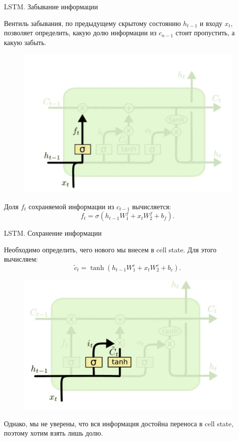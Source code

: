 \documentclass[notheorems, handout, 10pt]{beamer}
\begin{document}
	\begin{frame}{LSTM. Забывание информации}
		
		Вентиль забывания, по предыдущему скрытому состоянию $h_{t-1}$ и входу $x_t$, позволяет определить, какую долю информации из $c_{n-1}$ стоит пропустить, а какую забыть.
		
		\begin{figure}[H]
			\includegraphics[width=0.5\linewidth]{images/7}
		\end{figure}
		
		Доля $f_t$ сохраняемой информации из $c_{t-1}$ вычисляется: $$f_t=\sigma(h_{t-1}W_1^f + x_tW_2^f+b_f).$$
		
		\note{}
		
	\end{frame}
	
	\begin{frame}{LSTM. Сохранение информации}
		
		Необходимо определить, чего нового мы внесем в cell state. Для этого вычисляем: $$\tilde{c}_t = \tanh(h_{t-1}W_1^c+x_tW_2^c+b_c).$$ 
		
		\begin{figure}[H]
			\includegraphics[width=0.5\linewidth]{images/8}
		\end{figure}
		
		Однако, мы не уверены, что вся информация достойна переноса в cell state, поэтому хотим взять лишь долю.
		
		\note{}
		
	\end{frame}
	
\end{document}
